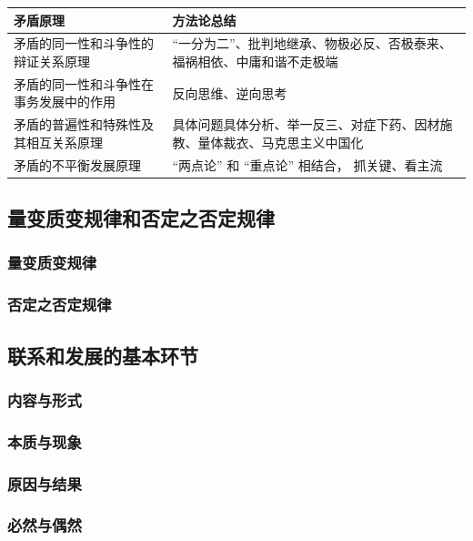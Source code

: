 \documentclass[10pt, UTF8]{book} %
\begin{document}
{ %
\label{矛盾分析方法} %
\begin{longtable}{p{}p{}}
    \toprule
    \textbf{矛盾原理} & \textbf{方法论总结} \\
    \toprule
    \endhead
    \bottomrule
    \endfoot

    矛盾的同一性和斗争性的辩证关系原理 & “一分为二”、批判地继承、物极必反、否极泰来、福祸相依、中庸和谐不走极端 \\ 
    矛盾的同一性和斗争性在事务发展中的作用 & 反向思维、逆向思考 \\ 
    矛盾的普遍性和特殊性及其相互关系原理 & 具体问题具体分析、举一反三、对症下药、因材施教、量体裁衣、马克思主义中国化 \\ 
    矛盾的不平衡发展原理 & “两点论” 和 “重点论” 相结合， 抓关键、看主流 \\
\end{longtable}}

\newpage
\subsection{量变质变规律和否定之否定规律}

\subsubsection{量变质变规律}
\subsubsection{否定之否定规律}

\subsection{联系和发展的基本环节}

\subsubsection{内容与形式}
\subsubsection{本质与现象}
\subsubsection{原因与结果}
\subsubsection{必然与偶然}
\end{document}
